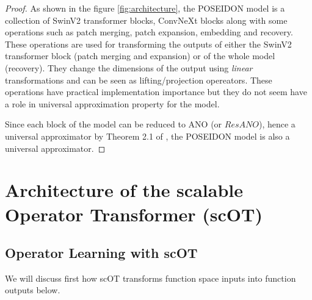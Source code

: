 \documentclass[reqno,10pt]{amsart}
\theoremstyle{plain}
\theoremstyle{definition}
\begin{document}
\begin{proof}
    As shown in the figure \ref{fig:architecture}, the POSEIDON model is a collection of SwinV2 transformer blocks, ConvNeXt blocks along with some operations such as patch merging, patch expansion, embedding and recovery. These operations are used for transforming the outputs of either the SwinV2 transformer block (patch merging and expansion) or of the whole model (recovery). They change the dimensions of the output using {\it linear} transformations and can be seen as lifting/projection opereators. These operations have practical implementation importance but they do not seem have a role in universal approximation property for the model.

    \noindent Since each block of the model can be reduced to ANO (or $ResANO$), hence a universal approximator by Theorem 2.1 of \cite{SL2024}, the POSEIDON model is also a universal approximator.
\end{proof}


\appendix
\section{\bf Architecture of the scalable Operator Transformer (scOT)}
\subsection{Operator Learning with scOT}
We will discuss first how scOT transforms function space inputs into function outputs below.
\end{document}
